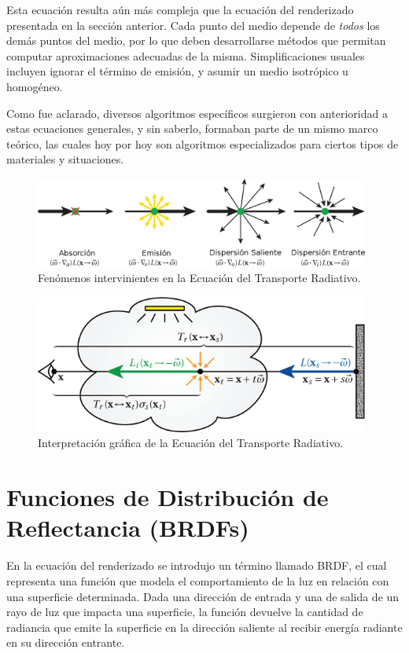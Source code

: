Esta ecuación resulta aún más compleja que la ecuación del renderizado presentada en la sección anterior.
Cada punto del medio depende de {\em todos} los demás puntos del medio, por lo que deben desarrollarse métodos que permitan computar aproximaciones adecuadas de la misma.
Simplificaciones usuales incluyen ignorar el término de emisión, y asumir un medio isotrópico u homogéneo.

Como fue aclarado, diversos algoritmos específicos surgieron con anterioridad a estas ecuaciones generales, y sin saberlo, formaban parte de un mismo marco teórico, las cuales hoy por hoy son algoritmos especializados para ciertos tipos de materiales y situaciones.



\begin{figure}
\center
\includegraphics[width=11cm]{figures/fenomenosrte}
\caption{Fenómenos intervinientes en la Ecuación del Transporte Radiativo.}
\label{fg:fenomenosrte}
\end{figure}

\begin{figure}
\center
\includegraphics[width=11cm]{figures/rte}
\caption{Interpretación gráfica de la Ecuación del Transporte Radiativo.}
\label{fg:rte}
\end{figure}


\section{Funciones de Distribución de Reflectancia (BRDFs)}
En la ecuación del renderizado se introdujo un término llamado BRDF, el cual representa una función que modela el comportamiento de la luz en relación con una superficie determinada.
Dada una dirección de entrada y una de salida de un rayo de luz que impacta una superficie, la función devuelve la cantidad de radiancia que emite la superficie en la dirección saliente al recibir energía radiante en su dirección entrante.

